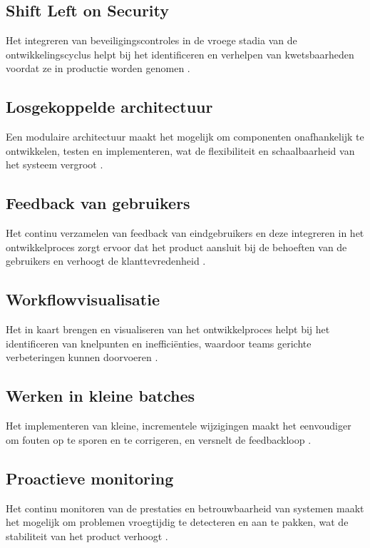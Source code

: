 \subsection{Shift Left on Security}
Het integreren van beveiligingscontroles in de vroege stadia van de ontwikkelingscyclus helpt bij het identificeren en verhelpen van kwetsbaarheden voordat ze in productie worden genomen \autocite{forsgren2018}.

\subsection{Losgekoppelde architectuur}
Een modulaire architectuur maakt het mogelijk om componenten onafhankelijk te ontwikkelen, testen en implementeren, wat de flexibiliteit en schaalbaarheid van het systeem vergroot \autocite{shahin2017}.

\subsection{Feedback van gebruikers}
Het continu verzamelen van feedback van eindgebruikers en deze integreren in het ontwikkelproces zorgt ervoor dat het product aansluit bij de behoeften van de gebruikers en verhoogt de klanttevredenheid \autocite{forsgren2018}.

\subsection{Workflowvisualisatie}
Het in kaart brengen en visualiseren van het ontwikkelproces helpt bij het identificeren van knelpunten en inefficiënties, waardoor teams gerichte verbeteringen kunnen doorvoeren \autocite{shahin2017}.

\subsection{Werken in kleine batches}
Het implementeren van kleine, incrementele wijzigingen maakt het eenvoudiger om fouten op te sporen en te corrigeren, en versnelt de feedbackloop \autocite{forsgren2018}.

\subsection{Proactieve monitoring}
Het continu monitoren van de prestaties en betrouwbaarheid van systemen maakt het mogelijk om problemen vroegtijdig te detecteren en aan te pakken, wat de stabiliteit van het product verhoogt \autocite{shahin2017}.

